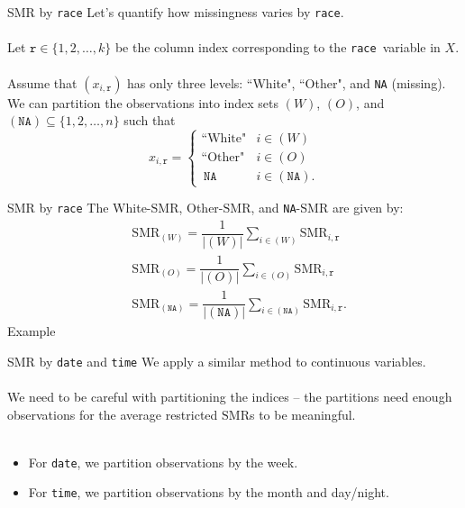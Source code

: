 \documentclass[11pt]{beamer}
\newcommand{\SMR}{\mathrm{SMR}}
\newcommand{\race}{\texttt{race}}
\newcommand{\rrr}{\texttt{r}}
\begin{document}
\begin{frame}{SMR by \race}
    Let's quantify how missingness varies by \race. 
    \\~\\
    Let $\rrr \in \{ 1, 2, \ldots, k \}$ be the column index corresponding to the \race \,  variable in $X$. 
    \\~\\
    Assume that $(x_{i, \rrr})$ has only three levels: ``White", ``Other", and \texttt{NA} (missing). We can partition the observations into index sets $(W)$, $(O)$, and $(\texttt{NA}) \subseteq \{1, 2, \ldots, n\}$ such that
    \begin{equation*}
    x_{i, \rrr} =
    \begin{cases}
    	\text{``White"} & i \in (W) \\
	\text{``Other"} & i \in (O) \\
	\, \texttt{NA} & i \in (\texttt{NA}).
    \end{cases}
    \end{equation*}
\end{frame}

\begin{frame}{SMR by \race}
    The White-$\SMR$, Other-$\SMR$, and \texttt{NA}-$\SMR$ are given by:
    \begin{align*}
    &\SMR_{(W)} = \dfrac{1}{ |(W)| } \sum_{i \in (W)} \SMR_{i, \rrr} \\
    &\SMR_{(O)} = \dfrac{1}{ |(O)| } \sum_{i \in (O)} \SMR_{i, \rrr} \\
    &\SMR_{(\texttt{NA})} = \dfrac{1}{ |(\texttt{NA})| } \sum_{i \in (\texttt{NA})} \SMR_{i, \rrr}.
    \end{align*}
    Example
\end{frame}

\begin{frame}{SMR by \texttt{date} and \texttt{time}}
	We apply a similar method to continuous variables.
	\\~\\
	We need to be careful with partitioning the indices -- the partitions need enough observations for the average restricted $\SMR$s to be meaningful.
	\\~\\ \pause
	\begin{itemize}
	\item For \texttt{date}, we partition observations by the week.
	\item For \texttt{time}, we partition observations by the month and day/night.
	\end{itemize}
	
	
	
\end{frame}
\end{document}
